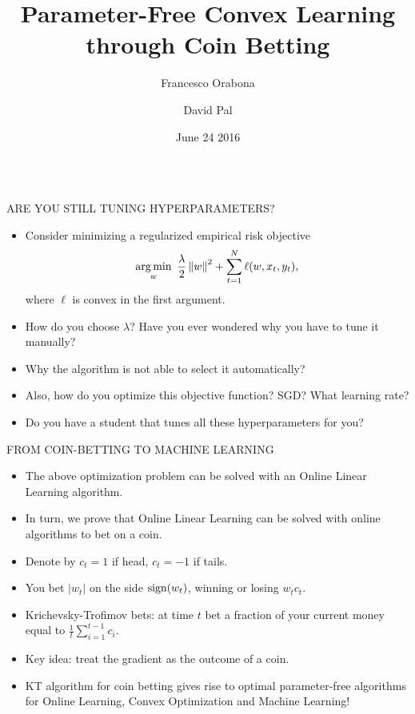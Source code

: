 \documentclass[final,t,serif,mathserif]{beamer}
\title{\huge Parameter-Free Convex Learning through Coin Betting}
\author{Francesco Orabona \and David Pal}
\institute[] %
{
  Yahoo Research, New York
}
\date[June 24 2016]{June 24 2016}
\def\spazio{\vspace{-0.325cm}}
\begin{document}
\begin{frame}{} 

\begin{columns}[t]
  \begin{column}{.33\linewidth}

    \begin{block}{ARE YOU STILL TUNING HYPERPARAMETERS?}
      \spazio
      \centering
      \begin{itemize}
      \item Consider minimizing a regularized empirical risk objective
      \[
         \operatorname*{arg\,min}_{w} \ \frac{\lambda}{2} \left\|{w}\right\|^2 + \sum_{t=1}^N \ell(w, x_t, y_t),
      \]
      where $\ell$ is convex in the first argument.
      \item How do you choose $\lambda$? Have you ever wondered why you have to tune it manually?
      \item Why the algorithm is not able to select it automatically?
      \item Also, how do you optimize this objective function? SGD? What learning rate?
      \item Do you have a student that tunes all these hyperparameters for you?
      \end{itemize}
      \spazio
    \end{block}
    

    \begin{block}{FROM COIN-BETTING TO MACHINE LEARNING}
    \spazio
    \begin{itemize}
      \item The above optimization problem can be solved with an Online Linear Learning algorithm.
      \item In turn, we prove that Online Linear Learning can be solved with online algorithms to bet on a coin.
      \item Denote by $c_t=1$ if head, $c_t=-1$ if tails.
      \item You bet $|w_t|$ on the side ${\rm sign}(w_t)$, winning or losing $ w_t c_t$.
      \item Krichevsky-Trofimov bets: at time $t$ bet a fraction of your current money equal to $\tfrac{1}{t} \sum_{i=1}^{t-1} c_i$.
      \item Key idea: treat the gradient as the outcome of a coin.
      \item \alert{KT algorithm for coin betting gives rise to optimal parameter-free algorithms for Online Learning, Convex Optimization and Machine Learning!}
    \end{itemize}
    \spazio
    \end{block}
    

\end{column}
\end{columns}
\end{frame}
\end{document}
